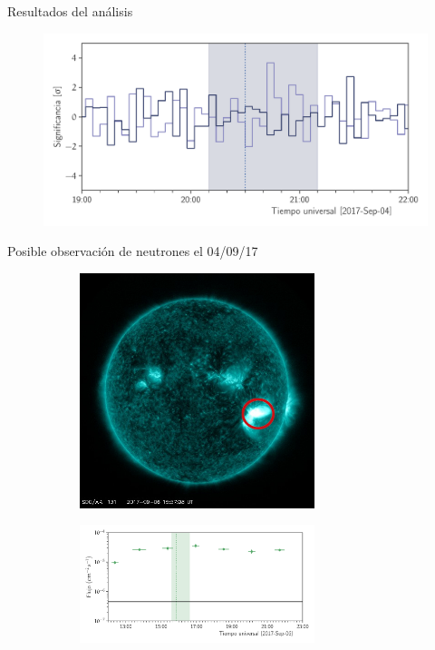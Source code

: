 \documentclass[spanish,aspectratio=169]{beamer}
\begin{document}
\begin{frame}{Resultados del análisis}

\begin{figure}
        \centering
        \includegraphics[width=\textwidth]{significance-170904.pdf}
\end{figure}

\end{frame}

\begin{frame}{Posible observación de neutrones el 04/09/17}

\begin{figure}
        \begin{subfigure}[b]{0.49\textwidth}
                \includegraphics[width=6.85cm]{sdo170906-1550-13.jpg}
        \end{subfigure}
        \begin{subfigure}[b]{0.49\textwidth}
                \includegraphics[width=6.85cm]{gammas-170906.pdf}
        \end{subfigure}
\end{figure}

\end{frame}
\end{document}
